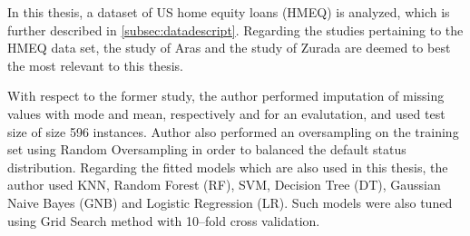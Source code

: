 In this thesis, a dataset of US home equity loans (HMEQ) is analyzed, which is further described in \autoref{subsec:datadescript}.
Regarding the studies pertaining to the HMEQ data set, the study of Aras \citep{serkan2021bagging} and the study of Zurada \citep{zurada2014classification} are deemed to best the most relevant to this thesis.


With respect to the former study, the author performed imputation of missing values with mode and mean, respectively and for an evalutation, and used test size of size 596 instances.
Author also performed an oversampling on the training set using Random Oversampling in order to balanced the default status distribution.
Regarding the fitted models which are also used in this thesis, the author used KNN, Random Forest (RF), SVM, Decision Tree (DT), Gaussian Naive Bayes (GNB) and Logistic Regression (LR).
Such models were also tuned using Grid Search method with 10--fold cross validation.

